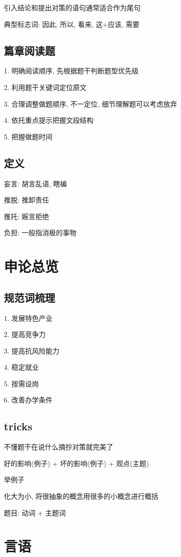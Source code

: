 引入结论和提出对策的语句通常适合作为尾句

典型标志词: 因此, 所以, 看来, 这+应该, 需要

\subsection{篇章阅读题}
1. 明确阅读顺序, 先根据题干判断题型优先级

2. 利用题干关键词定位原文

3. 合理调整做题顺序, 不一定位, 细节理解题可以考虑放弃

4. 依托重点提示把握文段结构

5. 把握做题时间

\subsection{定义}

妄言: 胡言乱语, 瞎编

推脱: 推卸责任

推托: 婉言拒绝

负担: 一般指消极的事物

\section{申论总览}

\subsection{规范词梳理}

1. 发展特色产业

2. 提高竞争力

3. 提高抗风险能力

4. 稳定就业

5. 按需设岗

6. 改善办学条件

\subsection{tricks}

不懂题干在说什么摘抄对策就完美了

好的影响(例子) + 坏的影响(例子) + 观点(主题)

举例子

化大为小, 将很抽象的概念用很多的小概念进行概括

题目: 动词 + 主题词


\section{言语}


